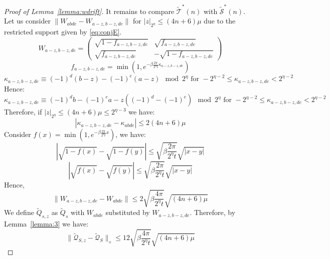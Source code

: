 \documentclass[aps,floatfix,10pt,amssymb,amsfont,amsmath,superscriptaddress,float,nofootinbib,longbibliography,nobalancelastpage,twocolumn]{revtex4-2}
\begin{document}
\begin{proof}[Proof of Lemma~\ref{lemma:wdrift}]
It remains to compare $\tilde{\mathcal{T}}^*(n)$ with $\tilde{\mathcal{S}}^*(n)$. Let us consider $\|W_{abde} - W_{a-z,b-z,de}\|$ for $|z|_{2^{\eta}}\leq (4n+6)\mu$ due to the restricted support given by \eqref{eq:conjE}.
\begin{equation}
     W_{a-z,b-z,de} = \begin{pmatrix}
        \sqrt{1 - f_{a-z,b-z,de}} & \sqrt{f_{a-z,b-z,de}}\\
       \sqrt{f_{a-z,b-z,de}} & -\sqrt{1 - f_{a-z,b-z,de}}
    \end{pmatrix}
\end{equation}
\begin{equation}
     f_{a-z,b-z,de} = \min(1,e^{-\beta \frac{2\pi}{2^{\eta}t}\kappa_{a-z,b-z,de}})
\end{equation}
\begin{equation}
    \kappa_{a-z,b-z,de} \equiv (-1)^d(b-z) - (-1)^e(a-z) \mod 2^{\eta} \text{ for } -2^{\eta-2} \leq \kappa_{a-z,b-z,de} < 2^{\eta-2}
\end{equation}
Hence:
\begin{equation}
    \kappa_{a-z,b-z,de} \equiv (-1)^db - (-1)^ea - z((-1)^d - (-1)^e) \mod 2^{\eta} \text{ for } -2^{\eta-2} \leq \kappa_{a-z,b-z,de} < 2^{\eta-2}
\end{equation}
Therefore, if $|z|_{2^{\eta}} \leq (4n+6)\mu\leq 2^{\eta-3}$ we have:
\begin{equation}
    |\kappa_{a-z,b-z,de} - \kappa_{abde}| \leq 2(4n+6)\mu
\end{equation}
Consider $f(x)=\min(1, e^{-\beta\frac{2\pi}{2^{\eta}t}x})$, we have:
\begin{equation}
    |\sqrt{1-f(x)} - \sqrt{1-f(y)}| \leq \sqrt{\beta\frac{2\pi}{2^{\eta}t}}\sqrt{|x-y|}
\end{equation}
\begin{equation}
    |\sqrt{f(x)} - \sqrt{f(y)}| \leq \sqrt{\beta\frac{2\pi}{2^{\eta}t}}\sqrt{|x-y|}
\end{equation}
Hence,
\begin{equation}
    \|W_{a-z,b-z,de} - W_{abde}\| \leq 2\sqrt{\beta\frac{4\pi}{2^{\eta}t}}\sqrt{(4n+6)\mu}
\end{equation}
We define $\tilde Q_{s,z}$ as $\tilde Q_s$ with $W_{abde}$ substituted by $W_{a-z,b-z,de}$. Therefore, by Lemma~\ref{lemma:3} we have:
\begin{equation}
    \|\tilde{\mathcal{Q}}_{S,z} - \tilde{\mathcal{Q}}_S\|_{\diamond} \leq 12\sqrt{\beta\frac{4\pi}{2^{\eta}t}}\sqrt{(4n+6)\mu}
\end{equation}
\end{proof}
\end{document}
